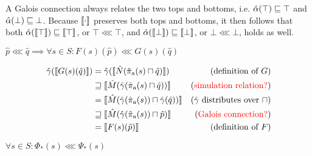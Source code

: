 A Galois connection always relates the two tops and bottoms, i.e. $\hat{\alpha}(\top) \sqsubseteq \top$ and $\hat{\alpha}(\bot) \sqsubseteq \bot$. Because $\llbracket \cdot \rrbracket$ preserves both tops and bottoms, it then follows that both $\hat{\alpha}(\llbracket \top \rrbracket) \sqsubseteq \llbracket \top \rrbracket$, or $\top \lll \top$, and $\hat{\alpha}(\llbracket \bot \rrbracket) \sqsubseteq \llbracket \bot \rrbracket$, or $\bot \lll \bot$, holds as well.

\begin{lemma} \label{lem:f-refine-g}
$\hat p \lll \hat q \implies \forall s \in S : F(s)(\hat p) \lll G(s)(\hat q)$
\end{lemma}
%
\begin{align*}
\hat{\gamma}(\llbracket G(s)(\hat q) \rrbracket)
  & =         \hat{\gamma}(\llbracket \hat N(\operatorname{\hat{\pi}_{\textrm{a}}}(s) \sqcap \hat q) \rrbracket)           & (\textrm{definition of } G) \\
  & \sqsupseteq \llbracket \hat M(\hat{\gamma}(\operatorname{\hat{\pi}_{\textrm{a}}}(s) \sqcap \hat q)) \rrbracket           & (\textrm{\textcolor{red}{simulation relation?}}) \\
  & =         \llbracket \hat M(\hat{\gamma}(\operatorname{\hat{\pi}_{\textrm{a}}}(s)) \sqcap \hat{\gamma}(\hat q)) \rrbracket  & (\hat{\gamma} \textrm{ distributes over } \sqcap) \\
  & \sqsupseteq \llbracket \hat M(\hat{\gamma}(\operatorname{\hat{\pi}_{\textrm{a}}}(s)) \sqcap \hat p) \rrbracket           & (\textrm{\textcolor{red}{Galois connection?}}) \\
  & =         \llbracket F(s)(\hat p) \rrbracket                                            & (\textrm{definition of } F)
\end{align*}

\begin{lemma} \label{lem:phi-refine-psi}
$\forall s \in S : \Phi_{*}(s) \lll \Psi_{*}(s)$
\end{lemma}

